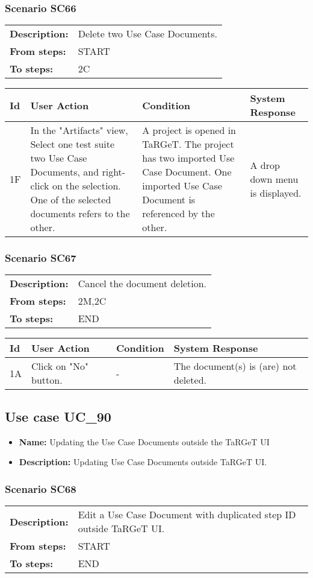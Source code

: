\documentclass[a4paper,11pt]{article}
\newcommand{\bl}{\\ \hline}
\begin{document}
\subsubsection*{Scenario SC66}
\begin{tabular}{p{1in}p{4in}}
{\bf Description:} & Delete two Use Case Documents. \\
{\bf From steps:} & START \\
{\bf To steps:} & 2C \\
\end{tabular}
 
\begin{tabular}{|p{0.8in}|p{1.6in}|p{1.6in}|p{1.6in}|}
\hline
Id & User Action & Condition & System Response  \bl 
1F & In the "Artifacts" view, Select one test suite two Use Case
						Documents, and right-click on the selection. One of the selected
						documents refers to the other.  & A project is opened in TaRGeT. The project has two
						imported Use Case Document. One imported Use Case Document is
						referenced by the other. & A drop down menu is displayed. \bl 
\end{tabular}
\subsubsection*{Scenario SC67}
\begin{tabular}{p{1in}p{4in}}
{\bf Description:} & Cancel the document deletion. \\
{\bf From steps:} & 2M,2C \\
{\bf To steps:} & END \\
\end{tabular}
 
\begin{tabular}{|p{0.8in}|p{1.6in}|p{1.6in}|p{1.6in}|}
\hline
Id & User Action & Condition & System Response  \bl 
1A & Click on "No" button. & - & The document(s) is (are) not deleted. \bl 
\end{tabular}
\subsection*{Use case UC_90}
\begin{itemize}
\item {\bf Name: }Updating the Use Case Documents outside the TaRGeT UI
\item {\bf Description: }Updating Use Case Documents outside TaRGeT UI.
			
\end{itemize}
\subsubsection*{Scenario SC68}
\begin{tabular}{p{1in}p{4in}}
{\bf Description:} & Edit a Use Case Document with duplicated step ID
					outside TaRGeT UI. \\
{\bf From steps:} & START \\
{\bf To steps:} & END \\
\end{tabular}
 
\end{document}
